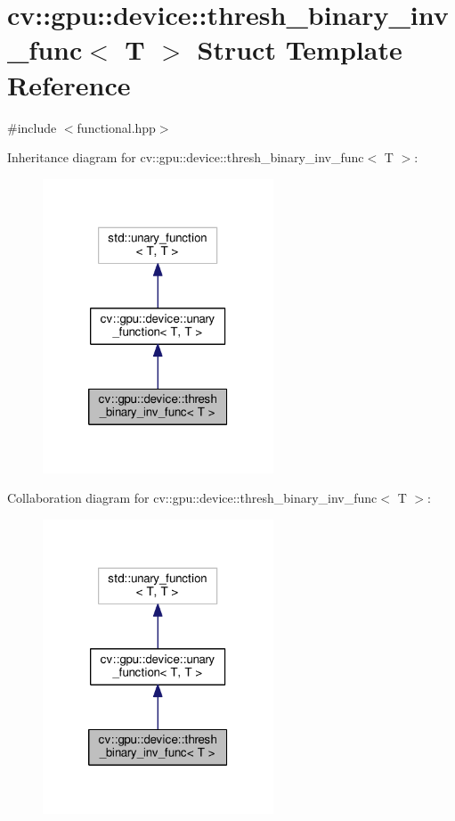 \hypertarget{structcv_1_1gpu_1_1device_1_1thresh__binary__inv__func}{\section{cv\-:\-:gpu\-:\-:device\-:\-:thresh\-\_\-binary\-\_\-inv\-\_\-func$<$ T $>$ Struct Template Reference}
\label{structcv_1_1gpu_1_1device_1_1thresh__binary__inv__func}
}


{\ttfamily \#include $<$functional.\-hpp$>$}



Inheritance diagram for cv\-:\-:gpu\-:\-:device\-:\-:thresh\-\_\-binary\-\_\-inv\-\_\-func$<$ T $>$\-:\nopagebreak
\begin{figure}[H]
\begin{center}
\leavevmode
\includegraphics[width=194pt]{structcv_1_1gpu_1_1device_1_1thresh__binary__inv__func__inherit__graph}
\end{center}
\end{figure}


Collaboration diagram for cv\-:\-:gpu\-:\-:device\-:\-:thresh\-\_\-binary\-\_\-inv\-\_\-func$<$ T $>$\-:\nopagebreak
\begin{figure}[H]
\begin{center}
\leavevmode
\includegraphics[width=194pt]{structcv_1_1gpu_1_1device_1_1thresh__binary__inv__func__coll__graph}
\end{center}
\end{figure}
